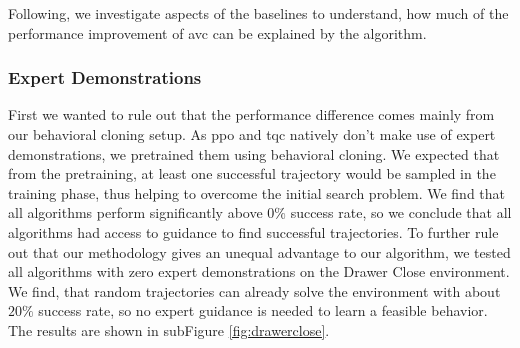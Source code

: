 Following, we investigate aspects of the baselines to understand, how much of the performance improvement of \ac{avc} can be explained by the algorithm. 

\subsubsection{Expert Demonstrations}
First we wanted to rule out that the performance difference comes mainly from our behavioral cloning setup. As \ac{ppo} and \ac{tqc} natively don't make use of expert demonstrations,
we pretrained them using behavioral cloning. We expected that from the pretraining, at least one successful trajectory would be sampled in the training phase, thus
helping to overcome the initial search problem. We find that all algorithms perform significantly above $0\%$ success rate, so we conclude that all algorithms had
access to guidance to find successful trajectories. To further rule out that our methodology gives an unequal advantage to our algorithm, we tested all algorithms with 
zero expert demonstrations on the 
Drawer Close environment. We find, that random trajectories can already solve the environment with about $20\%$ success rate, so no expert guidance is needed to learn a feasible behavior.
The results are shown in subFigure \ref{fig:drawerclose}.\\ 

